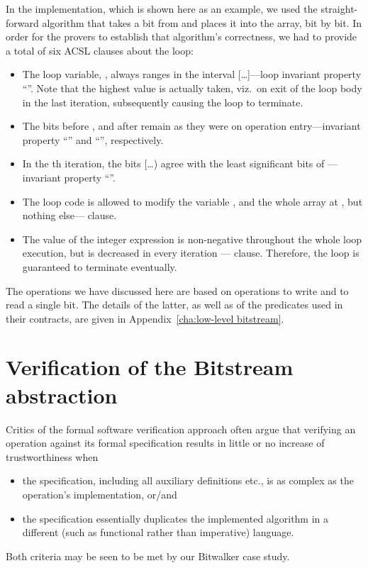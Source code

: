 In the implementation, which is shown here as an example, we used
the straight-forward
algorithm that takes a bit from  and places it into
the  array, bit by bit.
%
In order for the provers to establish that algorithm's correctness,
we had to provide a total of six ACSL clauses about the loop:
%
\begin{itemize}
\item The loop variable, , always ranges in the interval
	[\ldots{}]---loop invariant property ``''.
	Note that the highest value is actually taken,
	viz.\ on exit of the loop body in the last iteration,
	subsequently causing the loop to terminate.
\item The bits before , and after
	remain as they were on operation entry---invariant property
	``'' and ``'', respectively.
\item In the th iteration, the bits
	[\ldots{}) agree with
	the least significant
	 bits of ---invariant property
	``''.
\item The loop code is allowed to modify the variable ,
	and the whole array
	at , but nothing else---
	 clause.
\item The value of the integer
	expression  is non-negative throughout
	the whole loop execution, but is decreased in every iteration 
	---  clause.
	Therefore, the loop is guaranteed to terminate eventually.
\end{itemize}




The operations we have discussed here are based
on operations to write and to read a single bit.
%
The details of the latter, as well as of the predicates used in their
contracts, are given in Appendix~\ref{cha:low-level bitstream}.


\section{Verification of the Bitstream abstraction}
\label{sec:bitstream verif}



Critics of the formal software verification approach often 
argue that verifying an operation against its formal specification
results in little or no increase of trustworthiness when
%
\begin{itemize}
\item the specification, including all auxiliary definitions etc., is
	as complex as the operation's implementation, or/and
\item the specification essentially duplicates the implemented
	algorithm in a different (such as functional rather than
	imperative) language.
\end{itemize}
%
Both criteria may be seen to be met by our Bitwalker case study.



